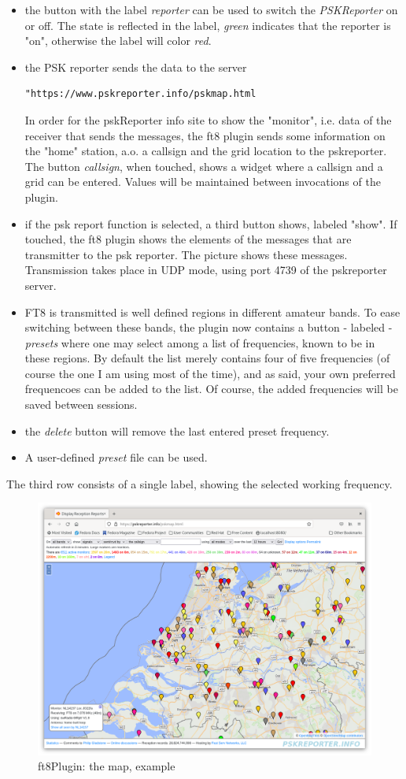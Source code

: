 \documentclass[11pt]{article}
\begin{document}
\begin{itemize}
\item the button with the label {\em reporter} can be used to switch
the {\em PSKReporter} on or off. The state is reflected in the label,
{\em green} indicates that the reporter is "on", otherwise the label
will color {\em red}.
\item the PSK reporter sends the data to the server 
{\footnotesize
\begin{verbatim}
"https://www.pskreporter.info/pskmap.html
\end{verbatim}
}
In order for the pskReporter info site to show the "monitor",
i.e. data of the receiver that sends the messages, the ft8 plugin
sends some information on the "home" station, a.o. a callsign and the 
grid location to the pskreporter.
The button {\em callsign}, when touched, shows a widget
where a callsign and a grid can be entered. Values will be maintained
between invocations of the plugin.
\item if the psk report function is selected, a third button shows,
labeled "show". If touched, the ft8 plugin shows the elements of
the messages  that are transmitter to the psk reporter.
The picture shows these messages.
Transmission takes place in UDP mode, using port 4739 of the pskreporter server.
\item FT8 is transmitted is well defined regions in different amateur bands. To
ease  switching between these bands, the plugin now contains a button - labeled
- {\em presets} where one may select among a list of frequencies, known to
be in these regions. By default the list merely contains four of five
frequencies (of course the one I am using most of the time), and as said,
your own preferred frequencoes can be added to the list.
Of course, the added frequencies will be saved between sessions.
\item the {\em delete} button will remove the last entered preset frequency.
\item A user-defined {\em preset} file can be used.
\end{itemize}
The third row consists of a single label, showing the selected working frequency.
\begin{figure}[htp]
\centering
\includegraphics[width=140mm]{pskreportermap.png}
\caption{ft8Plugin: the map, example}
\label{figure:pskReportermap}
\end{figure}
\end{document}
